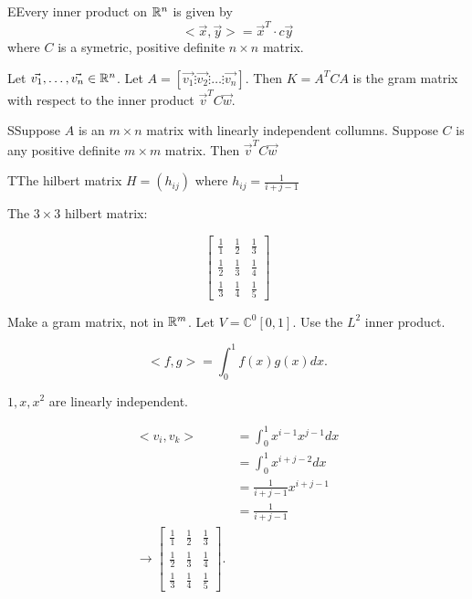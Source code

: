   \begin{theorem}
    EEvery inner product on $\mathbb{R}^{n}$ is given by 
    \begin{equation}
      <\vec{x},\vec{y}> = \vec{x}^{T}\cdot c\vec{y}
    \end{equation}
    where $C$ is a symetric, positive definite $n\times n$ matrix.
  \end{theorem}

  Let $\vec{v_1},\ldots,\vec{v_n}\in\mathbb{R}^{n}$. Let $A=[\vec{v_1}\vdots \vec{v_2} \vdots \ldots \vdots \vec{v_n}]$. Then $K=A^{T}CA$ is the gram matrix with respect to the inner product $\vec{v}^{T}C\vec{w}$.

  \begin{theorem}
    SSuppose $A$ is an $m\times n$ matrix with linearly independent collumns. Suppose $C$ is any positive definite $m\times m$ matrix. Then $\vec{v}^{T}C\vec{w}$
  \end{theorem}

  \begin{definition}
    TThe hilbert matrix $H=(h_{ij})$ where $h_{ij}=\frac{1}{i+j-1}$
  \end{definition}

  The $3\times 3$ hilbert matrix:

  \begin{equation}
    \begin{bmatrix} 
      \frac{1}{1}&\frac{1}{2}&\frac{1}{3}\\
      \frac{1}{2}&\frac{1}{3}&\frac{1}{4}\\
      \frac{1}{3}&\frac{1}{4}&\frac{1}{5}
    \end{bmatrix} 
  \end{equation}

  \begin{problem}
    Make a gram matrix, not in $\mathbb{R}^{m}$. Let $V=\mathbb{C}^{0}[0,1]$. Use the $L^{2}$ inner product.

    \begin{equation}
      <f,g> = \int_0^{1}f(x)g(x)dx
    .\end{equation}

    $1,x,x^2$ are linearly independent.

    \begin{align}
      <v_i,v_k> &= \int_0^{1}x^{i-1}x^{j-1}dx \\
                &=\int_0^{1}x^{i+j-2}dx\\
                &=\frac{1}{i+j-1}x^{i+j-1}\\
                &=\frac{1}{i+j-1}\\
                \to \begin{bmatrix} 
                  \frac{1}{1}&\frac{1}{2}&\frac{1}{3}\\
                  \frac{1}{2}&\frac{1}{3}&\frac{1}{4}\\
                  \frac{1}{3}&\frac{1}{4}&\frac{1}{5}
                \end{bmatrix} 
    .\end{align}
  \end{problem}
